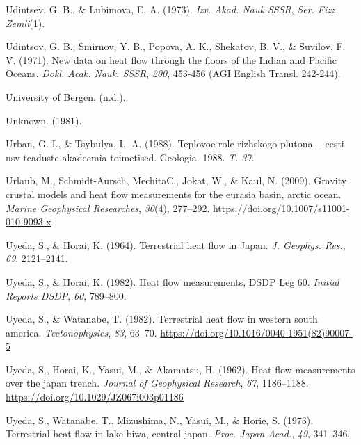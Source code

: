 \documentclass[draft,linenumbers]{agujournal2018}
\begin{document}
\leavevmode{}%
Udintsev, G. B., \& Lubimova, E. A. (1973). \emph{Izv. Akad. Nauk SSSR},
\emph{Ser. Fizz. Zemli}(1).

\leavevmode{}%
Udintsov, G. B., Smirnov, Y. B., Popova, A. K., Shekatov, B. V., \&
Suvilov, F. V. (1971). New data on heat flow through the floors of the
{Indian and Pacific Oceans}. \emph{Dokl. Acak. Nauk. SSSR}, \emph{200},
453-456 (AGI English Transl. 242-244).

\leavevmode{}%
University of Bergen. (n.d.).

\leavevmode{}%
Unknown. (1981).

\leavevmode{}%
Urban, G. I., \& Tsybulya, L. A. (1988). Teplovoe role rizhskogo
plutona. - eesti nsv teaduste akadeemia toimetised. Geologia. 1988.
\emph{T. 37}.

\leavevmode{}%
Urlaub, M., Schmidt-Aursch, MechitaC., Jokat, W., \& Kaul, N. (2009).
Gravity crustal models and heat flow measurements for the eurasia basin,
arctic ocean. \emph{Marine Geophysical Researches}, \emph{30}(4),
277--292. \url{https://doi.org/10.1007/s11001-010-9093-x}

\leavevmode{}%
Uyeda, S., \& Horai, K. (1964). Terrestrial heat flow in {Japan}.
\emph{J. Geophys. Res.}, \emph{69}, 2121--2141.

\leavevmode{}%
Uyeda, S., \& Horai, K. (1982). Heat flow measurements, DSDP {Leg} 60.
\emph{Initial Reports DSDP}, \emph{60}, 789--800.

\leavevmode{}%
Uyeda, S., \& Watanabe, T. (1982). Terrestrial heat flow in western
south america. \emph{Tectonophysics}, \emph{83}, 63--70.
\url{https://doi.org/10.1016/0040-1951(82)90007-5}

\leavevmode{}%
Uyeda, S., Horai, K., Yasui, M., \& Akamatsu, H. (1962). Heat-flow
measurements over the japan trench. \emph{Journal of Geophysical
Research}, \emph{67}, 1186--1188.
\url{https://doi.org/10.1029/JZ067i003p01186}

\leavevmode{}%
Uyeda, S., Watanabe, T., Mizushima, N., Yasui, M., \& Horie, S. (1973).
Terrestrial heat flow in lake biwa, central japan. \emph{Proc. Japan
Acad.}, \emph{49}, 341--346.
\end{document}
